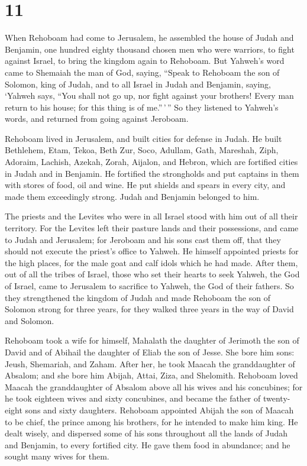 \hypertarget{section-10}{%
\section{11}\label{section-10}}

 When Rehoboam had come to Jerusalem, he assembled the
house of Judah and Benjamin, one hundred eighty thousand chosen men who
were warriors, to fight against Israel, to bring the kingdom again to
Rehoboam.  But Yahweh's word came to Shemaiah the man of
God, saying,  ``Speak to Rehoboam the son of Solomon, king
of Judah, and to all Israel in Judah and Benjamin, saying,
 `Yahweh says, ``You shall not go up, nor fight against
your brothers! Every man return to his house; for this thing is of
me.''\,'\,'' So they listened to Yahweh's words, and returned from going
against Jeroboam.

 Rehoboam lived in Jerusalem, and built cities for defense
in Judah.  He built Bethlehem, Etam, Tekoa, 
Beth Zur, Soco, Adullam,  Gath, Mareshah, Ziph,
 Adoraim, Lachish, Azekah,  Zorah, Aijalon,
and Hebron, which are fortified cities in Judah and in Benjamin.
 He fortified the strongholds and put captains in them
with stores of food, oil and wine.  He put shields and
spears in every city, and made them exceedingly strong. Judah and
Benjamin belonged to him.

 The priests and the Levites who were in all Israel stood
with him out of all their territory.  For the Levites
left their pasture lands and their possessions, and came to Judah and
Jerusalem; for Jeroboam and his sons cast them off, that they should not
execute the priest's office to Yahweh.  He himself
appointed priests for the high places, for the male goat and calf idols
which he had made.  After them, out of all the tribes of
Israel, those who set their hearts to seek Yahweh, the God of Israel,
came to Jerusalem to sacrifice to Yahweh, the God of their fathers.
 So they strengthened the kingdom of Judah and made
Rehoboam the son of Solomon strong for three years, for they walked
three years in the way of David and Solomon.

 Rehoboam took a wife for himself, Mahalath the daughter
of Jerimoth the son of David and of Abihail the daughter of Eliab the
son of Jesse.  She bore him sons: Jeush, Shemariah, and
Zaham.  After her, he took Maacah the granddaughter of
Absalom; and she bore him Abijah, Attai, Ziza, and Shelomith.
 Rehoboam loved Maacah the granddaughter of Absalom above
all his wives and his concubines; for he took eighteen wives and sixty
concubines, and became the father of twenty-eight sons and sixty
daughters.  Rehoboam appointed Abijah the son of Maacah
to be chief, the prince among his brothers, for he intended to make him
king.  He dealt wisely, and dispersed some of his sons
throughout all the lands of Judah and Benjamin, to every fortified city.
He gave them food in abundance; and he sought many wives for them.

